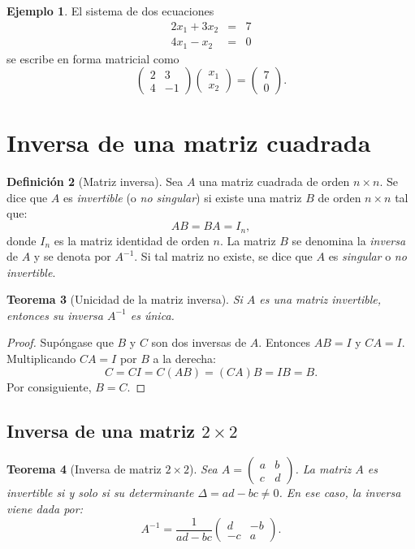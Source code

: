 \documentclass[11pt,letterpaper]{article}
\theoremstyle{definition}
\newtheorem{definicion}{Definición}[section]
\newtheorem{ejemplo}[definicion]{Ejemplo}
\theoremstyle{plain}
\newtheorem{teorema}[definicion]{Teorema}
\begin{document}
\begin{ejemplo}
El sistema de dos ecuaciones
\[
\begin{array}{rcccl}
2x_1 + 3x_2 &=& 7 \\
4x_1 - x_2 &=& 0
\end{array}
\]
se escribe en forma matricial como
\[
\begin{pmatrix} 2 & 3 \\ 4 & -1 \end{pmatrix} \begin{pmatrix} x_1 \\ x_2 \end{pmatrix} = \begin{pmatrix} 7 \\ 0 \end{pmatrix}.
\]
\end{ejemplo}

\section{Inversa de una matriz cuadrada}

\begin{definicion}[Matriz inversa]
Sea $A$ una matriz cuadrada de orden $n\times n$. Se dice que $A$ es \emph{invertible} (o \emph{no singular})
si existe una matriz $B$ de orden $n\times n$ tal que:
\[
A B = B A = I_n,
\]
donde $I_n$ es la matriz identidad de orden $n$. La matriz $B$ se denomina la \emph{inversa} de $A$ y se
denota por $A^{-1}$. Si tal matriz no existe, se dice que $A$ es \emph{singular} o \emph{no invertible}.
\end{definicion}

\begin{teorema}[Unicidad de la matriz inversa]
Si $A$ es una matriz invertible, entonces su inversa $A^{-1}$ es única.
\end{teorema}

\begin{proof}
Supóngase que $B$ y $C$ son dos inversas de $A$. Entonces $AB=I$ y $CA=I$. Multiplicando $CA=I$ por $B$ a
la derecha:
\[
C = C I = C (A B) = (C A) B = I B = B.
\]
Por consiguiente, $B=C$.
\end{proof}

\subsection{Inversa de una matriz $2\times 2$}

\begin{teorema}[Inversa de matriz $2\times 2$]
Sea $A = \begin{pmatrix} a & b \\ c & d \end{pmatrix}$. La matriz $A$ es invertible si y solo si
su \emph{determinante} $\Delta = ad - bc \neq 0$. En ese caso, la inversa viene dada por:
\[
A^{-1} = \frac{1}{ad - bc} \begin{pmatrix} d & -b \\ -c & a \end{pmatrix}.
\]
\end{teorema}
\end{document}
